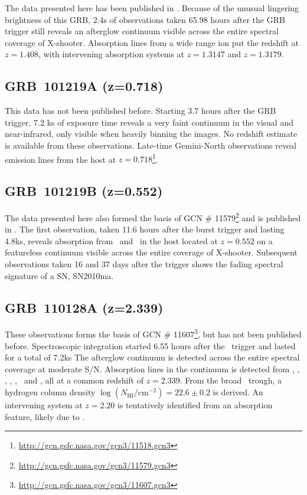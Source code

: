 \documentclass{aa}    %
\begin{document}
The data presented here has been published in \citet{Hartoog2013}. Because of
the unusual lingering brightness of this GRB, 2.4s of observations taken 65.98
hours after the GRB trigger still reveals an afterglow continuum visible across
the entire spectral coverage of X-shooter. Absorption lines from a wide range
ion put the redshift at $z=1.408$, with intervening absorption systems at $z =
1.3147$ and $z = 1.3179$.

\subsection{GRB~101219A (z=0.718)}

This data has not been published before. Starting 3.7 hours after the GRB
trigger, 7.2 ks of exposure time reveals a very faint continuum in the visual
and near-infrared, only visible when heavily binning the images. No redshift
estimate is available from these observations.  Late-time Gemini-North
observations reveal emission lines from the host at
$z=0.718$\footnote{\url{http://gcn.gsfc.nasa.gov/gcn3/11518.gcn3}}.

\subsection{GRB~101219B (z=0.552)} 

The data presented here also formed the basis of GCN \#
11579\footnote{\url{http://gcn.gsfc.nasa.gov/gcn3/11579.gcn3}} and is published
in \citet{Sparre2011}.	The first observation, taken 11.6 hours after the burst
trigger and lasting 4.8ks, reveals absorption from \mgii~and \mgi~in the host
located at $z = 0.552$ on a featureless continuum visible across the entire
coverage of X-shooter.  Subsequent observations taken 16 and 37 days after the
trigger shows the fading spectral signature of a SN, SN2010ma.


\subsection{GRB~110128A (z=2.339)}

These observations forms the basis of GCN \#
11607\footnote{\url{http://gcn.gsfc.nasa.gov/gcn3/11607.gcn3}}, but has not been
published before. Spectroscopic integration started 6.55 hours after the
\swift~trigger and lasted for a total of 7.2ks The afterglow continuum is
detected across the entire spectral coverage at moderate S/N. Absorption lines
in the continuum is detected from \lya, \oi, \cii, \SIiv, \civ, \SIii~and \feii,
all at a common redshift of $z=2.339$. From the broad \lya~trough, a hydrogen
column density $\log (N_{\mathrm{HI}}/\mathrm{cm}^{-2}) = 22.6 \pm 0.2$ is
derived. An intervening system at $z=2.20$ is tentatively identified from an
absorption feature, likely due to \civ.
\end{document}
